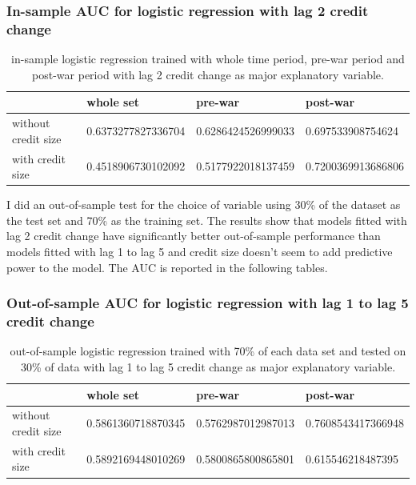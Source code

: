 \documentclass{article}
\begin{document}
\subsubsection*{\centering{}In-sample AUC for logistic regression with lag 2 credit change}

\begin{table}[H]
    \caption{in-sample logistic regression trained with whole time period,
    pre-war period and post-war period with lag 2 credit change as major
    explanatory variable.}
    \begin{center}\begin{tabular}{|l|l|l|l|}
    \hline
                        & whole set          & pre-war            & post-war           \\ \hline
    without credit size & 0.6373277827336704 & 0.6286424526999033 & 0.697533908754624  \\ \hline
    with credit size    & 0.4518906730102092 & 0.5177922018137459 & 0.7200369913686806 \\ \hline
    \end{tabular}\end{center}
\end{table}

I did an out-of-sample test for the choice of variable using
30\% of the dataset as the test set and 70\% as the training set.
The results show that models fitted with lag 2 credit change have
significantly better out-of-sample performance than models fitted with
lag 1 to lag 5 and credit size doesn't seem to add predictive
power to the model. The AUC is reported in the following tables.

\subsubsection*{\centering{}Out-of-sample AUC for logistic regression with lag 1 to lag 5 credit change}

\begin{table}[H]
    \caption{out-of-sample logistic regression trained with 70\% of
    each data set and tested on 30\% of data with lag 1 to lag 5
    credit change as major explanatory variable.}
    \begin{center}\begin{tabular}{|l|l|l|l|}
    \hline
                        & whole set          & pre-war            & post-war           \\ \hline
    without credit size & 0.5861360718870345 & 0.5762987012987013 & 0.7608543417366948 \\ \hline
    with credit size    & 0.5892169448010269 & 0.5800865800865801 & 0.615546218487395  \\ \hline
    \end{tabular}\end{center}
\end{table}
\end{document}
